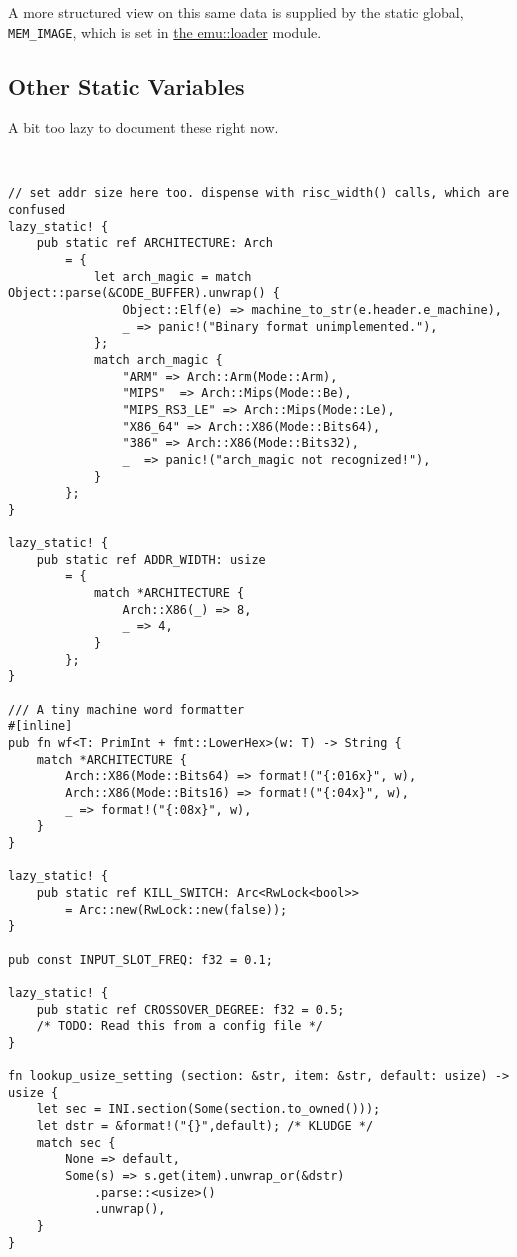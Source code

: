 \documentclass[11pt]{article}
\begin{document}
A more structured view on this same data is supplied by the static global,
\texttt{MEM\_IMAGE}, which is set in \href{../emu/loader.pdf}{the emu::loader} module.


\subsection{Other Static Variables}
\label{sec:org4759f27}

A bit too lazy to document these right now. 

\lstset{language=rust,label=org8496da7,caption= ,captionpos=b,numbers=none}
\begin{lstlisting}


// set addr size here too. dispense with risc_width() calls, which are confused
lazy_static! {
    pub static ref ARCHITECTURE: Arch
        = {
            let arch_magic = match Object::parse(&CODE_BUFFER).unwrap() {
                Object::Elf(e) => machine_to_str(e.header.e_machine),
                _ => panic!("Binary format unimplemented."),
            };
            match arch_magic {
                "ARM" => Arch::Arm(Mode::Arm),
                "MIPS"  => Arch::Mips(Mode::Be),
                "MIPS_RS3_LE" => Arch::Mips(Mode::Le),
                "X86_64" => Arch::X86(Mode::Bits64),
                "386" => Arch::X86(Mode::Bits32),
                _  => panic!("arch_magic not recognized!"),
            }
        };
}

lazy_static! {
    pub static ref ADDR_WIDTH: usize
        = {
            match *ARCHITECTURE {
                Arch::X86(_) => 8,
                _ => 4,
            }
        };
}

/// A tiny machine word formatter
#[inline]
pub fn wf<T: PrimInt + fmt::LowerHex>(w: T) -> String {
    match *ARCHITECTURE {
        Arch::X86(Mode::Bits64) => format!("{:016x}", w),
        Arch::X86(Mode::Bits16) => format!("{:04x}", w),
        _ => format!("{:08x}", w),
    }
}

lazy_static! {
    pub static ref KILL_SWITCH: Arc<RwLock<bool>>
        = Arc::new(RwLock::new(false));
}

pub const INPUT_SLOT_FREQ: f32 = 0.1;

lazy_static! {
    pub static ref CROSSOVER_DEGREE: f32 = 0.5;
    /* TODO: Read this from a config file */
}

fn lookup_usize_setting (section: &str, item: &str, default: usize) -> usize {
    let sec = INI.section(Some(section.to_owned()));
    let dstr = &format!("{}",default); /* KLUDGE */
    match sec {
        None => default,
        Some(s) => s.get(item).unwrap_or(&dstr)
            .parse::<usize>()
            .unwrap(),
    }
}


\end{lstlisting}
\end{document}
